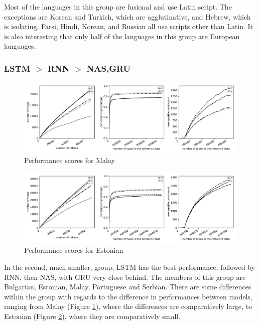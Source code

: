 \documentclass[11pt,a4paper,twoside,openright]{scrbook}
\begin{document}
Most of the languages in this group are fusional and use Latin script. The exceptions are Korean and Turkish, which are agglutinative, and Hebrew, which is isolating. Farsi, Hindi, Korean, and Russian all use scripts other than Latin. It is also interesting that only half of the languages in this group are European languages.

\subsubsection{LSTM $>$ RNN $>$ NAS,GRU}
\begin{figure}
\centering
\includegraphics[width=\textwidth]{graphs/ms_all_graphs}
\caption{Performance scores for Malay}
\label{Figure:ms_all_graphs}
\end{figure}

\begin{figure}
\centering
\includegraphics[width=\textwidth]{graphs/et_all_graphs}
\caption{Performance scores for Estonian}
\label{Figure:et_all_graphs}
\end{figure}

In the second, much smaller, group, LSTM has the best performance, followed by RNN, then NAS, with GRU very close behind. The members of this group are Bulgarian, Estonian, Malay, Portuguese and Serbian. There are some differences within the group with regards to the difference in performances between models, ranging from Malay (Figure \ref{Figure:ms_all_graphs}), where the differences are comparatively large, to Estonian (Figure \ref{Figure:et_all_graphs}), where they are comparatively small. 
\end{document}
